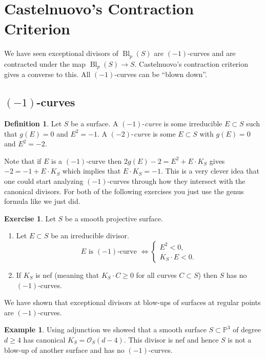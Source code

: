 \documentclass[12pt]{article}
\numberwithin{equation}{section}
\theoremstyle{definition}
\newtheorem{definition}[theorem]{Definition}
\newtheorem{example}[theorem]{Example}
\newtheorem{exercise}[theorem]{Exercise}
\theoremstyle{remark}
\newcommand{\Ocal}{\mathcal{O}}
\newcommand{\PP}{\mathbb{P}}
\newcommand{\Bl}{\operatorname{Bl}}
\begin{document}
\section{Castelnuovo's Contraction Criterion}

We have seen exceptional divisors of $\Bl_p(S)$ are $(-1)$-curves and are contracted under the map $\Bl_p(S)\to S$. 
Castelnuovo's contraction criterion gives a converse to this. 
All $(-1)$-curves can be ``blown down''.

\subsection{$(-1)$-curves}

\begin{definition}
	Let $S$ be a surface. 
	A $(-1)$-\emph{curve} is some irreducible $E\subset S$ such that $g(E)=0$ and $E^2=-1$. A $(-2)$-\emph{curve} is some $E\subset S$ with $g(E)=0$ and $E^2=-2$.
\end{definition}

Note that if $E$ is a $(-1)$-curve then 
$2g(E)-2 = E^2+E\cdot K_S$ gives $-2=-1+E\cdot K_S$ which implies that $E\cdot K_S=-1$. 
This is a very clever idea that one could start analyzing $(-1)$-curves through how they intersect with the canonical divisors. 
For both of the following exercises you just use the genus formula like we just did.
\begin{exercise}
	Let $S$ be a smooth projective surface. 
	\begin{enumerate}
		\item Let $E \subset S$ be an irreducible divisor. 
		$$\mbox{ $E$ is $(-1)$-curve } \iff 
		\begin{cases}
		E^2<0, & \\
		K_S\cdot E<0. & 
		\end{cases}$$
		\item If $K_S$ is nef (meaning that $K_S\cdot C\geq 0$ for all curves $C \subset S$) then $S$ has no $(-1)$-curves. 
	\end{enumerate}
\end{exercise}

We have shown that exceptional divisors at blow-ups of surfaces at regular points are  $(-1)$-curves. 
\begin{example}
	Using adjunction we showed that a smooth surface $S\subset\PP^3$ of degree $d\geq 4$ has canonical $K_S =\Ocal_S(d-4)$. 
	This divisor is nef and hence $S$ is not a blow-up of another surface and has no $(-1)$-curves.
\end{example}
\end{document}
